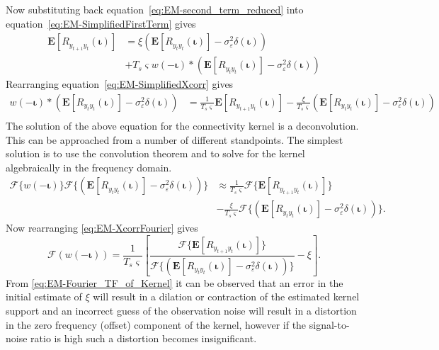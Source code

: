 \documentclass[]{article}
\begin{document}
Now substituting back equation~\eqref{eq:EM-second_term_reduced} into equation~\eqref{eq:EM-SimplifiedFirstTerm} gives
\begin{align}\label{eq:EM-SimplifiedXcorr}
	\mathbf{E}[R_{y_{t+1}y_t}(\boldsymbol{\iota})] &= \xi\left(\mathbf{E}[ R_{y_ty_t}(\boldsymbol{\iota})] - \sigma_{\varepsilon}^2 \delta(\boldsymbol{\iota})\right)\nonumber \\
&+T_s\varsigma w(-\boldsymbol\iota) \ast  (\mathbf{E}\left[R_{y_ty_t}(\boldsymbol\iota)\right] - \sigma_{\varepsilon}^2 \delta(\boldsymbol\iota))
\end{align}
Rearranging equation~\eqref{eq:EM-SimplifiedXcorr} gives
\begin{align}
	 w(-\boldsymbol\iota) \ast  (\mathbf{E}\left[R_{y_ty_t}(\boldsymbol\iota)\right] - \sigma_{\varepsilon}^2 \delta(\boldsymbol\iota))&=\frac{1}{T_s\varsigma}\mathbf{E}[R_{y_{t+1}y_t}(\boldsymbol{\iota})]-\frac{\xi}{T_s\varsigma}\left(\mathbf{E}[ R_{y_ty_t}(\boldsymbol{\iota})] - \sigma_{\varepsilon}^2 \delta(\boldsymbol{\iota})\right)\nonumber \\
\end{align}
The solution of the above equation for the connectivity kernel is a deconvolution. This can be approached from a number of different standpoints. The simplest solution is to use the convolution theorem and to solve for the kernel algebraically in the frequency domain.
\begin{align}\label{eq:EM-XcorrFourier}
	\mathcal{F}\{w(-\boldsymbol\iota)\} \mathcal{F}\{(\mathbf{E}\left[R_{y_ty_t}(\boldsymbol\iota)\right] - \sigma_{\varepsilon}^2 \delta(\boldsymbol\iota))\} &\approx \frac{1}{T_s\varsigma}\mathcal{F}\{\mathbf{E}[R_{y_{t+1}y_t}(\boldsymbol{\iota})]\}\nonumber \\
&-\frac{\xi}{T_s\varsigma}\mathcal{F} \{\left(\mathbf{E}[ R_{y_ty_t}(\boldsymbol{\iota})] - \sigma_{\varepsilon}^2 \delta(\boldsymbol{\iota})\right)\}.
\end{align}
Now rearranging \eqref{eq:EM-XcorrFourier} gives
\begin{equation}\label{eq:EM-Fourier_TF_of_Kernel}
	\mathcal{F}\left(w(-\boldsymbol\iota)\right) = \frac{1}{T_s\varsigma }\left[\frac{\mathcal{F}\{\mathbf{E}[R_{y_{t+1}y_t}(\boldsymbol{\iota})]\}}{\mathcal{F}\{(\mathbf{E}\left[R_{y_ty_t}(\boldsymbol\iota)\right] - \sigma_{\varepsilon}^2 \delta(\boldsymbol\iota))\}}-\xi\right].
\end{equation}
From \eqref{eq:EM-Fourier_TF_of_Kernel} it can be observed that an error in the initial estimate of $\xi$ will result in a dilation or contraction of the estimated kernel support and an incorrect guess of the observation noise will result in a distortion in the zero frequency (offset) component of the kernel, however if the signal-to-noise ratio is high such a distortion becomes insignificant. 
\end{document}
